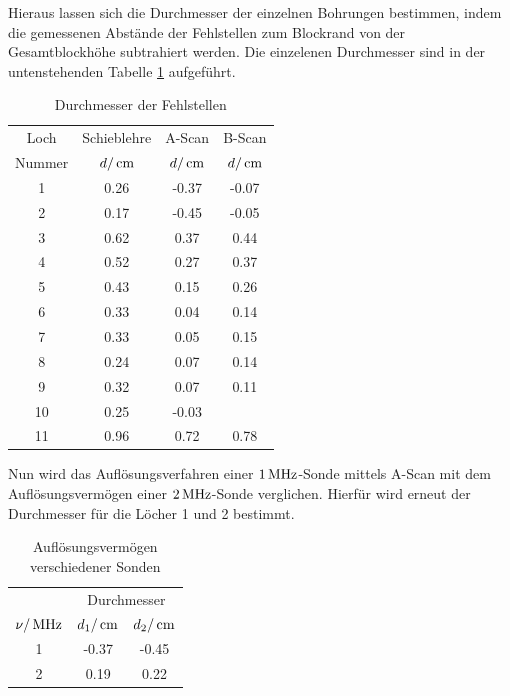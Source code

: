 Hieraus lassen sich die Durchmesser der einzelnen Bohrungen bestimmen, indem
die gemessenen Abstände der Fehlstellen zum Blockrand von der Gesamtblockhöhe
subtrahiert werden. Die einzelenen Durchmesser sind in der untenstehenden
Tabelle \ref{tab:durch} aufgeführt.
\begin{table}[H]
  \centering
  \begin{tabular}{cccc}
    \toprule
    \multicolumn{1}{c}{Loch}&\multicolumn{1}{c}{Schieblehre}&
    \multicolumn{1}{c}{A-Scan}&\multicolumn{1}{c}{B-Scan} \\
    Nummer & $d/\,\si{\centi\meter}$ & $d/\,\si{\centi\meter}$ & $d/\,\si{\centi\meter}$ \\
    \midrule
     1 & 0.26 & -0.37  &  -0.07      \\
     2 & 0.17 & -0.45  &  -0.05      \\
     3 & 0.62 &  0.37  &   0.44      \\
     4 & 0.52 &  0.27  &   0.37      \\
     5 & 0.43 &  0.15  &   0.26      \\
     6 & 0.33 &  0.04  &   0.14      \\
     7 & 0.33 &  0.05  &   0.15      \\
     8 & 0.24 &  0.07  &   0.14      \\
     9 & 0.32 &  0.07  &   0.11      \\
    10 & 0.25 & -0.03  &  \hrulefill \\
    11 & 0.96 &  0.72  &   0.78      \\
    \bottomrule
  \end{tabular}
  \caption{Durchmesser der Fehlstellen}
  \label{tab:durch}
\end{table}
Nun wird das Auflösungsverfahren einer $1\,\si{\mega\hertz}$-Sonde mittels A-Scan mit dem
Auflösungsvermögen einer $2\,\si{\mega\hertz}$-Sonde verglichen. Hierfür wird erneut der
Durchmesser für die Löcher 1 und 2 bestimmt.
\begin{table}
  \begin{tabular}{ccc}
    \centering
    \toprule
    \multicolumn{1}{c}{Sonde}&\multicolumn{2}{c}{Durchmesser}\\
    $\nu/\,\si{\mega\hertz}$ & $d_1/\,\si{\centi\meter}$ & $d_2/\,\si{\centi\meter}$ \\
    \midrule
    1  &  -0.37  &  -0.45 \\
    2  &   0.19  &   0.22 \\
    \bottomrule
  \end{tabular}
  \caption{Auflösungsvermögen verschiedener Sonden}
  \label{tab:auf}
\end{table}
